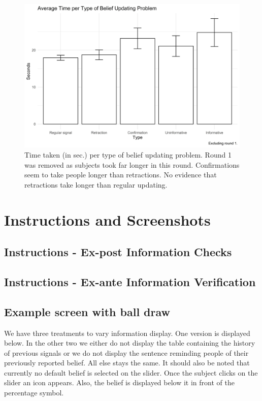 \documentclass{article}
\begin{document}
\begin{figure}[!htb]
    \centering
    \includegraphics[width=12cm]{Fig/02_fig_time_belief_type.jpg}
    \caption{Time taken (in sec.) per type of belief updating problem. Round 1 was removed as subjects took far longer in this round. Confirmations seem to take people longer than retractions. No evidence that retractions take longer than regular updating.}
\end{figure}



\newpage
\section{Instructions and Screenshots}

\subsection{Instructions - Ex-post Information Checks}


\subsection{Instructions - Ex-ante Information Verification}




\subsection{Example screen with ball draw}

We have three treatments to vary information display. One version is displayed below. In the other two we either do not display the table containing the history of previous signals or we do not display the sentence reminding people of their previously reported belief. All else stays the same. It should also be noted that currently no default belief is selected on the slider. Once the subject clicks on the slider an icon appears. Also, the belief is displayed below it in front of the percentage symbol.
\end{document}

